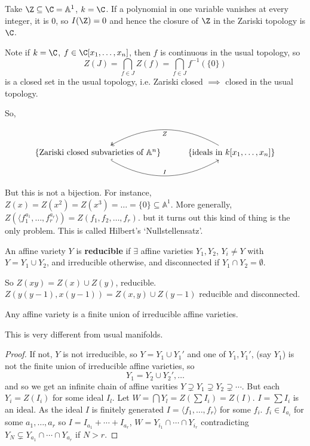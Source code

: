 \documentclass{article}
\newcommand{\A}{\mathbb{A}}
\begin{document}
Take $\Z \subseteq \C = \A^1$, $k = \C$.
If a polynomial in one variable vanishes at every integer, it is $0$, so $I(\Z) = 0$ and hence the closure of $\Z$ in the Zariski topology is $\C$.

Note if $k = \C$, $f \in \C[x_1, \dotsc, x_n]$, then $f$ is continuous in the usual topology, so
\begin{equation*}
    Z(J) = \bigcap_{f \in J} Z(f) = \bigcap_{f \in J} f^{-1}(\{0\})
\end{equation*}
is a closed set in the usual topology, i.e. Zariski closed $\implies$ closed in the usual topology.

So,
\begin{equation*}
\begin{tikzcd}
    \{\text{Zariski closed subvarieties of } \A^n\} \ar[r, bend right, hookrightarrow, "I"]& \{\text{ideals in } k[x_1, \dotsc, x_n]\} \ar[l, bend right, two heads, "Z"]
\end{tikzcd}
\end{equation*}
But this is not a bijection. For instance,
$Z(x) = Z(x^2) = Z(x^3) = \dotsc = \{0\} \subseteq \A^1$.
More generally,
$Z(\langle f_1^{a_1}, \dotsc, f_r^{a_r}\rangle) = Z(f_1, f_2, \dotsc, f_r)$.
but it turns out this kind of thing is the only problem.
This is called Hilbert's `Nullstellensatz'.
\begin{defi}
    An affine variety $Y$ is \textbf{reducible} if $\exists$ affine varieties $Y_1, Y_2$, $Y_i \neq Y$ with $Y = Y_1 \cup Y_2$, and irreducible otherwise, and disconnected if $Y_1 \cap Y_2 = \emptyset$.
\end{defi}
So $Z(xy) = Z(x) \cup Z(y)$, reducible.
$Z(y(y-1), x(y-1)) = Z(x,y) \cup Z(y-1)$ reducible and disconnected.
\begin{prop}
    Any affine variety is a finite union of irreducible affine varieties.
\end{prop}
\begin{remark}
    This is very different from usual manifolds.
\end{remark}
\begin{proof}
    If not, $Y$ is not irreducible, so $Y = Y_1 \cup Y_1'$ and one of $Y_1, Y_1'$, (say $Y_1$) is not the finite union of irreducible affine varieties, so
    \begin{equation*}
        Y_1 = Y_2 \cup Y_2', \dotsc
    \end{equation*}
    and so we get an infinite chain of affine varities $Y \supsetneq Y_1 \supsetneq Y_2 \supsetneq \dotsb$.
    But each $Y_i = Z(I_i)$ for some ideal $I_l$. Let $W = \bigcap Y_l = Z(\sum I_i) = Z(I)$.
    $I = \sum I_i$ is an ideal. As the ideal $I$ is finitely generated $I = \langle f_1, \dotsc, f_r \rangle$ for some $f_i$.
    $f_i \in I_{a_i}$ for some $a_1, \dotsc, a_r$ so $I = I_{a_1} + \dotsb + I_{a_r}$, $W = Y_{i_1} \cap \dotsb \cap Y_{i_r}$ contradicting $Y_N \subsetneq Y_{a_1} \cap \dotsb \cap Y_{a_r}$ if $N > r$.
\end{proof}
\end{document}
